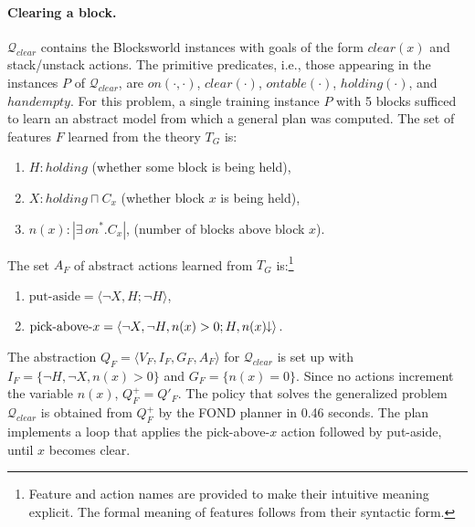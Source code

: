 \documentclass[letterpaper]{article} %
\newcommand{\tup}[1]{\langle #1 \rangle}
\newcommand{\abs}[1]{\ensuremath{\left\vert{#1}\right\vert}}
\newcommand{\Q}{\mathcal{Q}}
\newcommand{\abst}[2]{\tup{#1;#2}}
\newcommand{\mminus}{\hspace{-.05em}\raisebox{.15ex}{\footnotesize$\downarrow$}}
\begin{document}
\paragraph{Clearing a block.}
$\Q_{clear}$ contains the Blocksworld instances  with goals of the form  $clear(x)$
and stack/unstack actions. The primitive predicates, i.e., those appearing in the  instances $P$ of $\Q_{clear}$, 
are $on(\cdot,\cdot)$, $clear(\cdot)$, $ontable(\cdot)$, $holding(\cdot)$, and $handempty$. 
For this problem, a  single training instance $P$  with  5 blocks sufficed to learn an abstract model from
which a general plan was computed. The  set of  features $F$ learned  from the theory $T_G$ is:

\begin{enumerate}[--]
  \item $H: holding$ (whether some block is being held),
  \item $X: holding \sqcap C_x$ (whether block $x$ is being held),
  \item $n(x): \abs{\exists\,on^* . C_x}$, (number of blocks above block $x$).
\end{enumerate}

\noindent The set $A_F$  of abstract actions learned  from $T_G$ is:\footnote{
Feature and action names are provided   to make their intuitive meaning explicit.
The formal meaning of features  follows from their syntactic form.}

\begin{enumerate}[--]
  \item $\text{put-aside} = \abst{\neg X, H}{\neg H}$,
  \item $\text{pick-above-$x$} = \abst{\neg X, \neg H, n(x) > 0}{H, n(x)\mminus}$.
\end{enumerate}

The  abstraction $Q_F=\tup{V_F,I_F,G_F,A_F}$ for $\Q_{clear}$ is set up with 
$I_F = \{\neg H, \neg X, n(x) > 0\}$ and $G_F=\{n(x)=0\}$.
Since no actions increment the variable $n(x)$, 
$Q^+_F=Q'_F$. The policy that solves the generalized problem $\Q_{clear}$
is obtained from $Q^+_F$ by the FOND planner in 0.46 seconds. The plan implements
a loop that applies the pick-above-$x$ action followed by put-aside,
until $x$ becomes clear. 


% 
\end{document}
